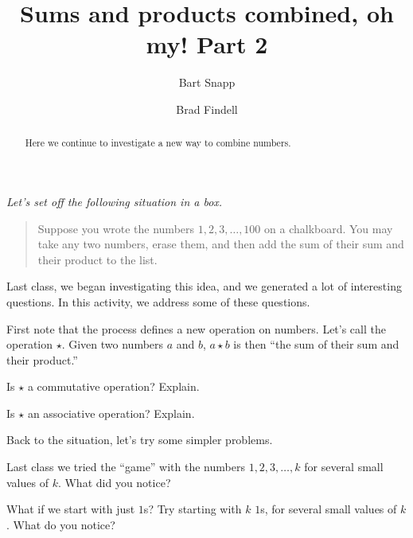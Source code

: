 \documentclass{ximera}
\title{Sums and products combined, oh my!  Part 2}
\author{Bart Snapp \and Brad Findell}
\begin{document}
\begin{abstract}
Here we continue to investigate a new way to combine numbers.
\end{abstract}
\maketitle

\emph{Let's set off the following situation in a box.} 
\begin{quote}
Suppose you wrote the numbers $1,2,3,\dots,100$ on a chalkboard. You
may take any two numbers, erase them, and then add the sum of their
sum and their product to the list.
\end{quote}
Last class, we began investigating this idea, and we generated a lot
of interesting questions.  In this activity, we address some of these
questions.

First note that the process defines a new operation on numbers.  Let's
call the operation $\star$.  Given two numbers $a$ and $b$, $a\star b$
is then ``the sum of their sum and their product.''

\begin{problem}
Is $\star$ a commutative operation?  Explain.  
\begin{freeResponse}
\end{freeResponse}
\end{problem}

\begin{problem}
Is $\star$ an associative operation?  Explain.  
\begin{freeResponse}
\end{freeResponse}
\end{problem}

Back to the situation, let's try some simpler problems.  

\begin{problem}
Last class we tried the ``game'' with the numbers $1,2,3,\dots, k$ for
several small values of $k$.  What did you notice?
\begin{freeResponse}
\end{freeResponse}
\end{problem}

\begin{problem}
What if we start with just $1$s?  Try starting with $k$ $1$s, for
several small values of $k$.  What do you notice?
\begin{freeResponse}
\end{freeResponse}
\end{problem}
\end{document}
